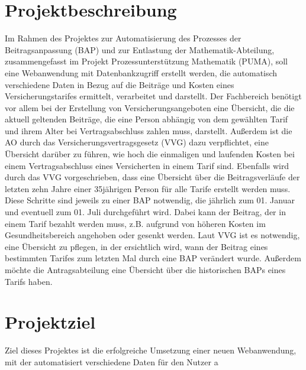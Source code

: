 \documentclass[a4paper,12pt]{book}
\begin{document}
\section{Projektbeschreibung}
Im Rahmen des Projektes zur Automatisierung des Prozesses der Beitragsanpassung (BAP) und zur Entlastung der Mathematik-Abteilung, zusammengefasst im Projekt Prozessunterstützung Mathematik (PUMA), soll eine Webanwendung mit Datenbankzugriff erstellt werden, die automatisch verschiedene Daten in Bezug auf die Beiträge und Kosten eines Versicherungstarifes ermittelt, verarbeitet und darstellt.
Der Fachbereich benötigt vor allem bei der Erstellung von Versicherungsangeboten eine Übersicht, die die aktuell geltenden Beiträge, die eine Person abhängig von dem gewählten Tarif und ihrem Alter bei Vertragsabschluss zahlen muss, darstellt. Außerdem ist die AO durch das Versicherungsvertragsgesetz (VVG) dazu verpflichtet, eine Übersicht darüber zu führen, wie hoch die einmaligen und laufenden Kosten bei einem Vertragsabschluss eines Versicherten in einem Tarif sind. Ebenfalls wird durch das VVG vorgeschrieben, dass eine Übersicht über die Beitragsverläufe der letzten zehn Jahre einer 35jährigen Person für alle Tarife erstellt werden muss.
Diese Schritte sind jeweils zu einer BAP notwendig, die jährlich zum 01. Januar und eventuell zum 01. Juli durchgeführt wird. Dabei kann der Beitrag, der in einem Tarif bezahlt werden muss, z.B. aufgrund von höheren Kosten im Gesundheitsbereich angehoben oder gesenkt werden. Laut VVG ist es notwendig, eine Übersicht zu pflegen, in der ersichtlich wird, wann der Beitrag eines bestimmten Tarifes zum letzten Mal durch eine BAP verändert wurde. Außerdem möchte die Antragsabteilung eine Übersicht über die historischen BAPs eines Tarifs haben.

\section{Projektziel}
Ziel dieses Projektes ist die erfolgreiche Umsetzung einer neuen Webanwendung, mit der automatisiert verschiedene Daten für den Nutzer a
\end{document}
